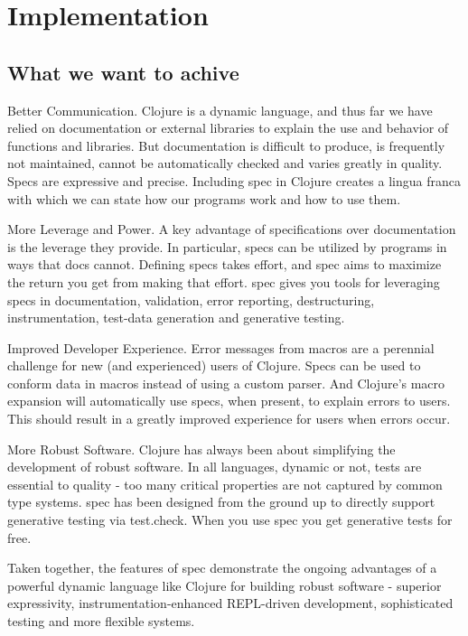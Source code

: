 \chapter{Implementation}
\label{chap:implementation}

\section{What we want to achive}

Better Communication. Clojure is a dynamic language, and thus far we have relied
on documentation or external libraries to explain the use and behavior of
functions and libraries. But documentation is difficult to produce, is
frequently not maintained, cannot be automatically checked and varies greatly in
quality. Specs are expressive and precise. Including spec in Clojure creates a
lingua franca with which we can state how our programs work and how to use them.

More Leverage and Power. A key advantage of specifications over documentation is
the leverage they provide. In particular, specs can be utilized by programs in
ways that docs cannot. Defining specs takes effort, and spec aims to maximize
the return you get from making that effort. spec gives you tools for leveraging
specs in documentation, validation, error reporting, destructuring,
instrumentation, test-data generation and generative testing.

Improved Developer Experience. Error messages from macros are a perennial
challenge for new (and experienced) users of Clojure. Specs can be used to
conform data in macros instead of using a custom parser. And Clojure’s macro
expansion will automatically use specs, when present, to explain errors to
users. This should result in a greatly improved experience for users when errors
occur.

More Robust Software. Clojure has always been about simplifying the development
of robust software. In all languages, dynamic or not, tests are essential to
quality - too many critical properties are not captured by common type systems.
spec has been designed from the ground up to directly support generative testing
via test.check. When you use spec you get generative tests for free.

Taken together, the features of spec demonstrate the ongoing advantages of a
powerful dynamic language like Clojure for building robust software - superior
expressivity, instrumentation-enhanced REPL-driven development, sophisticated
testing and more flexible systems.

